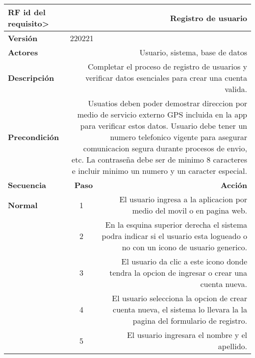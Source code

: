 \documentclass[conference]{IEEEtran}
\begin{document}
\begin{table}[H]
  \centering
  \begin{adjustbox}{width=0.45\textwidth}
    \begin{tabular}{|p{11.215em}|r|r|}
    \toprule
    \textbf{RF id del requisito>} & \multicolumn{2}{p{37.43em}|}{\textbf{Registro de usuario}} \\
    \midrule
    \textbf{Versión} & \multicolumn{2}{l|}{220221} \\
    \midrule
    \textbf{Actores} & \multicolumn{2}{p{37.43em}|}{Usuario, sistema, base de datos} \\
    \midrule
    \textbf{Descripción} & \multicolumn{2}{p{37.43em}|}{Completar el proceso de registro de usuarios y verificar datos esenciales para crear una cuenta valida.} \\
    \midrule
    \textbf{Precondición} & \multicolumn{2}{p{37.43em}|}{Usuatios deben poder demostrar direccion por medio de servicio externo GPS incluida en la app para verificar estos datos. Usuario debe tener un numero telefonico vigente para asegurar comunicacion segura durante procesos de envio, etc. La contraseña debe ser de minimo 8 caracteres e incluir minimo un numero y un caracter especial.} \\
    \midrule
    \textbf{Secuencia} & \textbf{Paso} & \multicolumn{1}{p{32em}|}{\textbf{Acción}} \\
    \midrule
    \textbf{Normal} & \multicolumn{1}{c|}{1} & \multicolumn{1}{p{32em}|}{El usuario ingresa a la aplicacion por medio del movil o en pagina web.} \\
    \midrule
    \multicolumn{1}{|r|}{} & \multicolumn{1}{c|}{2} & \multicolumn{1}{p{32em}|}{En la esquina superior derecha el sistema podra indicar si el usuario esta logueado o no con un icono de usuario generico.} \\
    \midrule
    \multicolumn{1}{|r|}{} & \multicolumn{1}{c|}{3} & \multicolumn{1}{p{32em}|}{El usuario da clic a este icono donde tendra la opcion de ingresar o crear una cuenta nueva.} \\
    \midrule
    \multicolumn{1}{|r|}{} & \multicolumn{1}{c|}{4} & \multicolumn{1}{p{32em}|}{El usuario selecciona la opcion de crear cuenta nueva, el sistema lo llevara la la pagina del formulario de registro.} \\
    \midrule
    \multicolumn{1}{|r|}{} & \multicolumn{1}{c|}{5} & \multicolumn{1}{p{32em}|}{El usuario ingresara el nombre y el apellido.} \\

\end{tabular}
\end{adjustbox}
\end{table}
\end{document}
